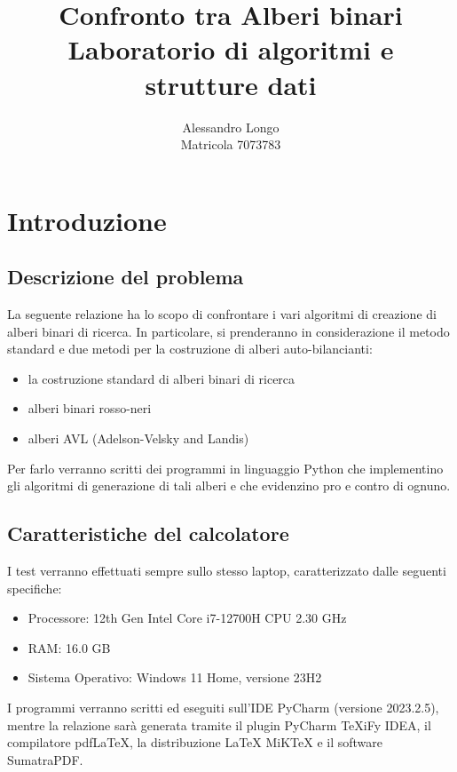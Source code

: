 \documentclass[a4paper,12pt]{article}
\title{\bfseries Confronto tra Alberi binari \\ \large Laboratorio di algoritmi e strutture dati}
\author{Alessandro Longo \\ Matricola 7073783}
\begin{document}
    \maketitle

    \newpage
    \tableofcontents

    \newpage


    \section{Introduzione}

    \subsection{Descrizione del problema}
    La seguente relazione ha lo scopo di confrontare i vari algoritmi di creazione di alberi binari di ricerca. In
    particolare, si prenderanno in considerazione il metodo standard e due metodi per la costruzione di alberi
    auto-bilancianti:
    \begin{itemize}
        \item la costruzione standard di alberi binari di ricerca
        \item alberi binari rosso-neri
        \item alberi AVL (Adelson-Velsky and Landis)
    \end{itemize}
    Per farlo verranno scritti dei programmi in linguaggio Python che implementino gli algoritmi di generazione di tali
    alberi e che evidenzino pro e contro di ognuno.

    \subsection{Caratteristiche del calcolatore}
    I test verranno effettuati sempre sullo stesso laptop, caratterizzato dalle seguenti specifiche:
    \begin{itemize}
        \item Processore: 12th Gen Intel Core i7-12700H CPU 2.30 GHz
        \item RAM: 16.0 GB
        \item Sistema Operativo: Windows 11 Home, versione 23H2
    \end{itemize}
    I programmi verranno scritti ed eseguiti sull’IDE PyCharm (versione 2023.2.5), mentre la relazione sarà generata
    tramite il plugin PyCharm TeXiFy IDEA, il compilatore pdfLaTeX, la distribuzione LaTeX MiKTeX e il software
    SumatraPDF.
\end{document}
